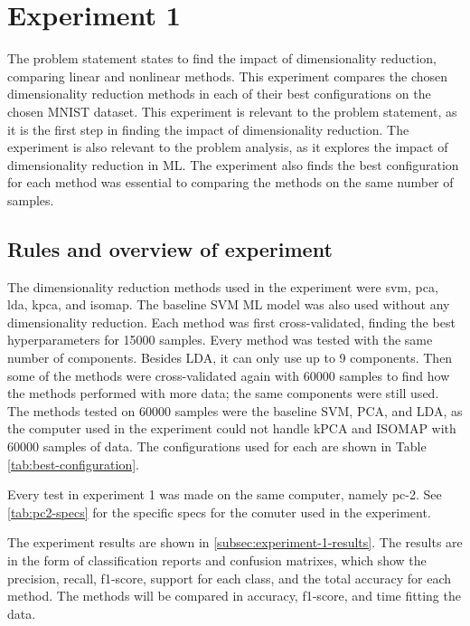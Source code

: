 \section{Experiment 1}\label{sec:experiment-1}
The problem statement states to find the impact of dimensionality reduction, comparing linear and nonlinear methods. This experiment compares the chosen dimensionality reduction methods in each of their best configurations on the chosen MNIST dataset. This experiment is relevant to the problem statement, as it is the first step in finding the impact of dimensionality reduction. The experiment is also relevant to the problem analysis, as it explores the impact of dimensionality reduction in ML. The experiment also finds the best configuration for each method was essential to comparing the methods on the same number of samples.



\subsection{Rules and overview of experiment}\label{subsec:experiment-1-rules}
The dimensionality reduction methods used in the experiment were \gls{svm}, \gls{pca}, \gls{lda}, \gls{kpca}, and \gls{isomap}. The baseline SVM ML model was also used without any dimensionality reduction. Each method was first cross-validated, finding the best hyperparameters for 15000 samples. Every method was tested with the same number of components. Besides LDA, it can only use up to 9 components. Then some of the methods were cross-validated again with 60000 samples to find how the methods performed with more data; the same components were still used. The methods tested on 60000 samples were the baseline SVM, PCA, and LDA, as the computer used in the experiment could not handle kPCA and ISOMAP with 60000 samples of data. The configurations used for each are shown in Table \ref{tab:best-configuration}.



Every test in experiment 1 was made on the same computer, namely pc-2. See \autoref{tab:pc2-specs} for the specific specs for the comuter used in the experiment. 

The experiment results are shown in \autoref{subsec:experiment-1-results}. The results are in the form of classification reports and confusion matrixes, which show the precision, recall, f1-score, support for each class, and the total accuracy for each method. The methods will be compared in accuracy, f1-score, and time fitting the data.

